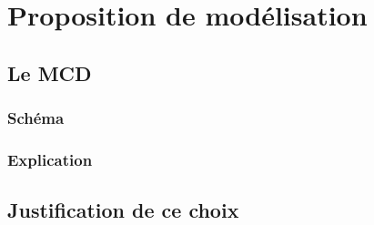 \chapter{Proposition de modélisation}

\section{Le MCD}

\subsection{Schéma}

\subsection{Explication}

\section{Justification de ce choix}